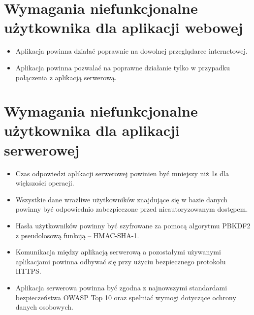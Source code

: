 \documentclass[a4paper,twoside,12pt]{book}
\begin{document}
\section{Wymagania niefunkcjonalne użytkownika dla aplikacji webowej}
\begin{itemize}
    \item Aplikacja powinna działać poprawnie na dowolnej przeglądarce internetowej.
    \item Aplikacja powinna pozwalać na poprawne działanie tylko w przypadku połączenia z aplikacją serwerową.
\end{itemize}

\section{Wymagania niefunkcjonalne użytkownika dla aplikacji serwerowej}
\begin{itemize}
    \item Czas odpowiedzi aplikacji serwerowej powinien być mniejszy niż 1s dla większości operacji.
    \item Wszystkie dane wrażliwe użytkowników znajdujące się w bazie danych powinny być odpowiednio zabezpieczone przed nieautoryzowanym dostępem.
    \item Hasła użytkowników powinny być szyfrowane za pomocą algorytmu PBKDF2 z pseudolosową funkcją -- HMAC-SHA-1.
    \item Komunikacja między aplikacją serwerową a pozostałymi używanymi aplikacjami powinna odbywać się przy użyciu bezpiecznego protokołu HTTPS.
    \item Aplikacja serwerowa powinna być zgodna z najnowszymi standardami bezpieczeństwa OWASP Top 10 oraz spełniać wymogi dotyczące ochrony danych osobowych.
\end{itemize}
\end{document}
